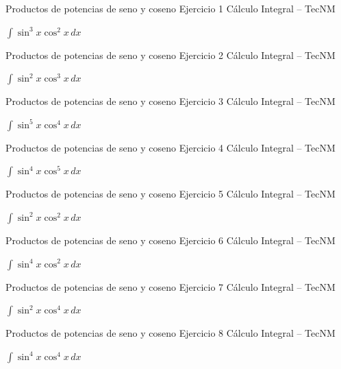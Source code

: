 \documentclass[aspectratio=169,12pt]{beamer}
\newcommand{\ejercicio}[1]{%
  \begin{center}
  \vfill
  {\fontsize{24}{30}\selectfont #1}
  \vfill
  \end{center}
}
\begin{document}
\begin{frame}{Productos de potencias de seno y coseno}
\small Ejercicio 1 \hfill Cálculo Integral -- TecNM
\ejercicio{$\displaystyle \int \sin^3 x\cos^2 x\,dx$}
\end{frame}
\begin{frame}{Productos de potencias de seno y coseno}
\small Ejercicio 2 \hfill Cálculo Integral -- TecNM
\ejercicio{$\displaystyle \int \sin^2 x\cos^3 x\,dx$}
\end{frame}
\begin{frame}{Productos de potencias de seno y coseno}
\small Ejercicio 3 \hfill Cálculo Integral -- TecNM
\ejercicio{$\displaystyle \int \sin^5 x\cos^4 x\,dx$}
\end{frame}
\begin{frame}{Productos de potencias de seno y coseno}
\small Ejercicio 4 \hfill Cálculo Integral -- TecNM
\ejercicio{$\displaystyle \int \sin^4 x\cos^5 x\,dx$}
\end{frame}
\begin{frame}{Productos de potencias de seno y coseno}
\small Ejercicio 5 \hfill Cálculo Integral -- TecNM
\ejercicio{$\displaystyle \int \sin^2 x\cos^2 x\,dx$}
\end{frame}
\begin{frame}{Productos de potencias de seno y coseno}
\small Ejercicio 6 \hfill Cálculo Integral -- TecNM
\ejercicio{$\displaystyle \int \sin^4 x\cos^2 x\,dx$}
\end{frame}
\begin{frame}{Productos de potencias de seno y coseno}
\small Ejercicio 7 \hfill Cálculo Integral -- TecNM
\ejercicio{$\displaystyle \int \sin^2 x\cos^4 x\,dx$}
\end{frame}
\begin{frame}{Productos de potencias de seno y coseno}
\small Ejercicio 8 \hfill Cálculo Integral -- TecNM
\ejercicio{$\displaystyle \int \sin^4 x\cos^4 x\,dx$}
\end{frame}
\end{document}
